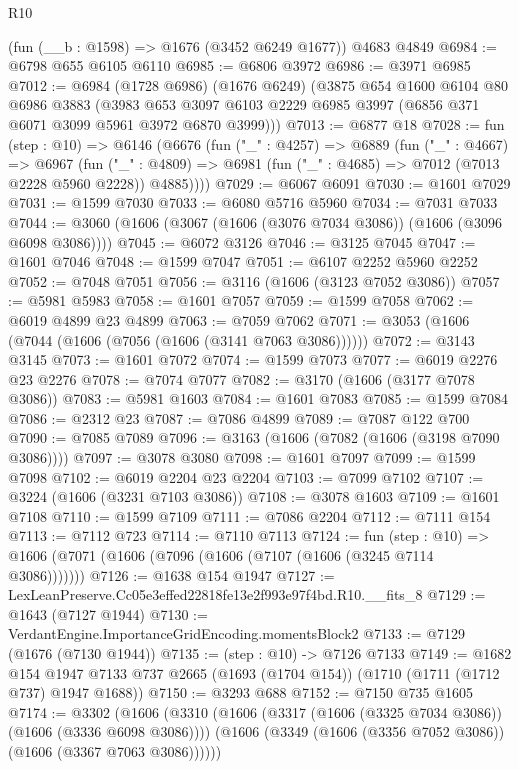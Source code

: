 \begin{lexlean}{R10}
\begin{coremodule}
    (fun (__b : @1598) => @1676 (@3452 @6249 @1677))
    @4683
    @4849
@6984 := @6798 @655 @6105 @6110
@6985 := @6806 @3972
@6986 := @3971 @6985
@7012 := @6984
    (@1728 @6986)
    (@1676 @6249)
    (@3875
      @654
      @1600
      @6104
      @80
      @6986
      @3883
      (@3983 @653 @3097 @6103 @2229 @6985 @3997 (@6856 @371 @6071 @3099 @5961 @3972 @6870 @3999)))
@7013 := @6877 @18
@7028 := fun (step : @10) =>
  @6146
    (@6676
      (fun ("_" : @4257) =>
      @6889
        (fun ("_" : @4667) =>
        @6967
          (fun ("_" : @4809) =>
          @6981 (fun ("_" : @4685) => @7012 (@7013 @2228 @5960 @2228)) @4885))))
@7029 := @6067 @6091
@7030 := @1601 @7029
@7031 := @1599 @7030
@7033 := @6080 @5716 @5960
@7034 := @7031 @7033
@7044 := @3060 (@1606 (@3067 (@1606 (@3076 @7034 @3086)) (@1606 (@3096 @6098 @3086))))
@7045 := @6072 @3126
@7046 := @3125 @7045
@7047 := @1601 @7046
@7048 := @1599 @7047
@7051 := @6107 @2252 @5960 @2252
@7052 := @7048 @7051
@7056 := @3116 (@1606 (@3123 @7052 @3086))
@7057 := @5981 @5983
@7058 := @1601 @7057
@7059 := @1599 @7058
@7062 := @6019 @4899 @23 @4899
@7063 := @7059 @7062
@7071 := @3053 (@1606 (@7044 (@1606 (@7056 (@1606 (@3141 @7063 @3086))))))
@7072 := @3143 @3145
@7073 := @1601 @7072
@7074 := @1599 @7073
@7077 := @6019 @2276 @23 @2276
@7078 := @7074 @7077
@7082 := @3170 (@1606 (@3177 @7078 @3086))
@7083 := @5981 @1603
@7084 := @1601 @7083
@7085 := @1599 @7084
@7086 := @2312 @23
@7087 := @7086 @4899
@7089 := @7087 @122 @700
@7090 := @7085 @7089
@7096 := @3163 (@1606 (@7082 (@1606 (@3198 @7090 @3086))))
@7097 := @3078 @3080
@7098 := @1601 @7097
@7099 := @1599 @7098
@7102 := @6019 @2204 @23 @2204
@7103 := @7099 @7102
@7107 := @3224 (@1606 (@3231 @7103 @3086))
@7108 := @3078 @1603
@7109 := @1601 @7108
@7110 := @1599 @7109
@7111 := @7086 @2204
@7112 := @7111 @154
@7113 := @7112 @723
@7114 := @7110 @7113
@7124 := fun (step : @10) =>
  @1606 (@7071 (@1606 (@7096 (@1606 (@7107 (@1606 (@3245 @7114 @3086)))))))
@7126 := @1638 @154 @1947
@7127 := LexLeanPreserve.Cc05e3effed22818fe13e2f993e97f4bd.R10.__fits_8
@7129 := @1643 (@7127 @1944)
@7130 := VerdantEngine.ImportanceGridEncoding.momentsBlock2
@7133 := @7129 (@1676 (@7130 @1944))
@7135 := (step : @10) -> @7126 @7133
@7149 := @1682
    @154
    @1947
    @7133
    @737
    @2665
    (@1693 (@1704 @154))
    (@1710 (@1711 (@1712 @737) @1947 @1688))
@7150 := @3293 @688
@7152 := @7150 @735 @1605
@7174 := @3302
    (@1606
      (@3310
        (@1606 (@3317 (@1606 (@3325 @7034 @3086)) (@1606 (@3336 @6098 @3086))))
        (@1606 (@3349 (@1606 (@3356 @7052 @3086)) (@1606 (@3367 @7063 @3086))))))

\end{coremodule}
\end{lexlean}
